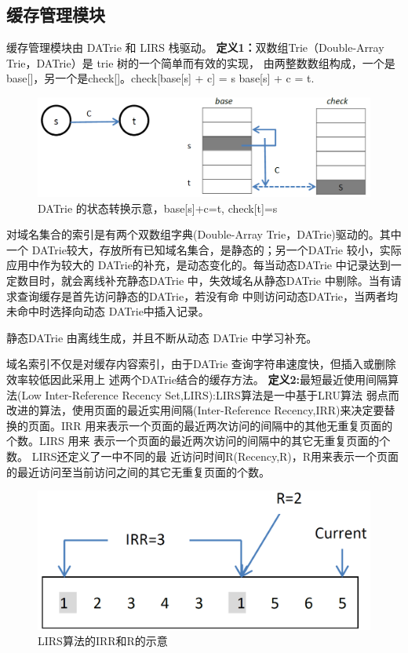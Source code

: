 

\subsection{缓存管理模块} 
\par{缓存管理模块由 DATrie 和 LIRS 栈驱动。}
\textbf{定义1：}双数组Trie（Double-Array  Trie，DATrie）是 trie 树的一个简单而有效的实现，
由两整数数组构成，一个是 base[]，另一个是check[]。check[base[s] + c] = s base[s]
+ c = t.

\begin{figure}[H]
\centering
\includegraphics[keepaspectratio, scale=0.4]{pitures/aaa.png}
\caption{ DATrie 的状态转换示意，base[s]+c=t, check[t]=s } 
\end{figure}
\par{对域名集合的索引是有两个双数组字典(Double-Array  Trie，DATrie)驱动的。其中
	一个 DATrie较大，存放所有已知域名集合，是静态的；另一个DATrie 较小，实际应用中作为较大的
	DATrie的补充，是动态变化的。每当动态DATrie 中记录达到一定数目时，就会离线补充静态DATrie
	中，失效域名从静态DATrie 中剔除。当有请求查询缓存是首先访问静态的DATrie，若没有命
	中则访问动态DATrie，当两者均未命中时选择向动态 DATrie中插入记录。 
}


\par{ 静态DATrie 由离线生成，并且不断从动态 DATrie 中学习补充。 }
\par{ 域名索引不仅是对缓存内容索引，由于DATrie 查询字符串速度快，但插入或删除效率较低因此采用上
	述两个DATrie结合的缓存方法。 }
\textbf{ 定义2:}最短最近使用间隔算法(Low  Inter-Reference  Recency  Set,LIRS):LIRS算法是一中基于LRU算法
	弱点而改进的算法，使用页面的最近实用间隔(Inter-Reference Recency,IRR)来决定要替
	换的页面。IRR 用来表示一个页面的最近两次访问的间隔中的其他无重复页面的个数。LIRS 用来
	表示一个页面的最近两次访问的间隔中的其它无重复页面的个数。 LIRS还定义了一中不同的最
	近访问时间R(Recency,R)，R用来表示一个页面的最近访问至当前访问之间的其它无重复页面的个数。
\begin{figure}[H]
\centering
\includegraphics[keepaspectratio, scale=0.4]{pitures/irr.png}
\caption{LIRS算法的IRR和R的示意} 
\end{figure}


